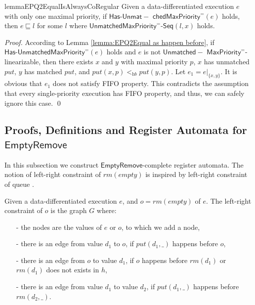 \begin{restatable}{lemma}{EPQ2EqualIsAlwaysCoRegular}
\label{lemma:EPQ2Equal is always co-regular}
Given a data-differentiated execution $e$ with only one maximal priority, if $\mathsf{Has\text{-}}\mathsf{Unmat-}$ $\mathsf{chedMaxPriority}^{=}(e)$ holds, then $e \sqsubseteq l$ for some $l$ where $\mathsf{UnmatchedMaxPriority}^{=}\mathsf{\text{-}Seq}(l,x)$ holds. 
\end{restatable}

\begin {proof}

According to Lemma \ref{lemma:EPQ2Equal as happen before}, if $\mathsf{Has\text{-}}\mathsf{UnmatchedMaxPriority}^{=}(e)$ holds and $e$ is not $\mathsf{Unmatched-}$ $\mathsf{MaxPriority}^{=}$-linearizable, then there exists $x$ and $y$ with maximal priority $p$, $x$ has unmatched $\textit{put}$, $y$ has matched $\textit{put}$, and $\textit{put}(x,p) <_{\textit{hb}} \textit{put}(y,p)$. Let $e_1 = e \vert_{ \{ x,y \} }$. It is obvious that $e_1$ does not satisfy FIFO property. This contradicts the assumption that every single-priority execution has FIFO property, and thus, we can safely ignore this case. \qed
\end {proof}




\subsection{Proofs, Definitions and Register Automata for $\mathsf{EmptyRemove}$}
\label{subsec:co-regular of EPQ3}

In this subsection we construct $\mathsf{EmptyRemove}$-complete register automata. The notion of left-right constraint of $\textit{rm}(\textit{empty})$ is inspired by left-right constraint of queue \cite{DBLP:conf/icalp/BouajjaniEEH15}.

\begin{definition}\label{def:left-right constraint for rmEmpty operation}
Given a data-differentiated execution $e$, and $o = \textit{rm}(\textit{empty})$ of $e$. The left-right constraint of $o$ is the graph $G$ where:

\begin{itemize}
\setlength{\itemsep}{0.5pt}
\item[-] the nodes are the values of $e$ or $o$, to which we add a node,

\item[-] there is an edge from value $d_1$ to $o$, if $\textit{put}(d_1,\_)$ happens before $o$,

\item[-] there is an edge from $o$ to value $d_1$, if $o$ happens before $\textit{rm}(d_1)$ or $\textit{rm}(d_1)$ does not exists in $h$,

\item[-] there is an edge from value $d_1$ to value $d_2$, if $\textit{put}(d_1,\_)$ happens before $\textit{rm}(d_2,\_)$.
\end{itemize}
\end{definition}


